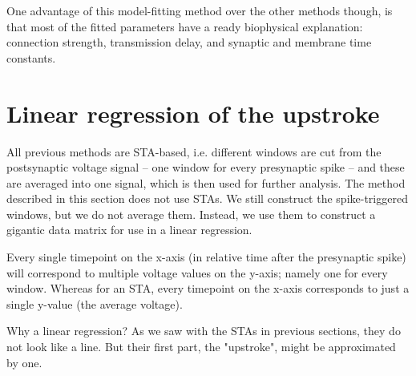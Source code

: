 One advantage of this model-fitting method over the other methods though, is that most of the fitted parameters have a ready biophysical explanation: connection strength, transmission delay, and synaptic and membrane time constants.








\clearpage
\section{Linear regression of the upstroke}

All previous methods are STA-based, i.e. different windows are cut from the postsynaptic voltage signal -- one window for every presynaptic spike -- and these are averaged into one signal, which is then used for further analysis. The method described in this section does not use STAs. We still construct the spike-triggered windows, but we do not average them. Instead, we use them to construct a gigantic data matrix for use in a linear regression.

Every single timepoint on the x-axis (in relative time after the presynaptic spike) will correspond to multiple voltage values on the y-axis; namely one for every window. Whereas for an STA, every timepoint on the x-axis corresponds to just a single y-value (the average voltage).

Why a linear regression? As we saw with the STAs in previous sections, they do not look like a line. But their first part, the "upstroke", might be approximated by one.

